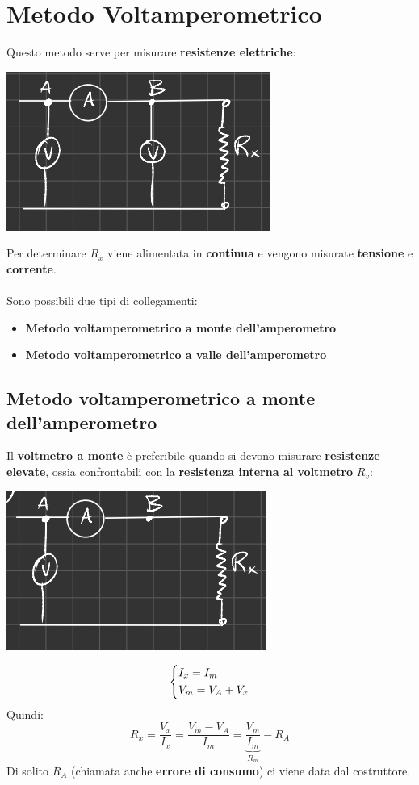 \chapter{Metodo Voltamperometrico}
Questo metodo serve per misurare \textbf{resistenze elettriche}:
\begin{center}
    \includegraphics[width=.4\textwidth]{Images/figure2.png}
\end{center}
Per determinare $R_x$ viene alimentata in \textbf{continua} e vengono misurate \textbf{tensione} e \textbf{corrente}.\\ \\
Sono possibili due tipi di collegamenti:
\begin{itemize}
    \item \textbf{Metodo voltamperometrico a monte dell'amperometro}
    \item \textbf{Metodo voltamperometrico a valle dell'amperometro}
\end{itemize}
\section{Metodo voltamperometrico a monte dell'amperometro}
Il \textbf{voltmetro a monte} è preferibile quando si devono misurare \textbf{resistenze elevate}, ossia confrontabili con la \textbf{resistenza interna al voltmetro} $R_v$:
\begin{center}
    \includegraphics[width=.4\textwidth]{Images/figure3.png}
\end{center}
\begin{equation*}
\begin{dcases}
     I_x = I_m\\
    V_m = V_A + V_x
\end{dcases}
\end{equation*}
Quindi:
\begin{equation*}
    R_x = \frac{V_x}{I_x} = \frac{V_m - V_A}{I_m} = \underbrace{\frac{V_m}{I_m}}_{R_m} - R_A
\end{equation*}
Di solito $R_A$ (chiamata anche \textbf{errore di consumo}) ci viene data dal costruttore.\\ \\
